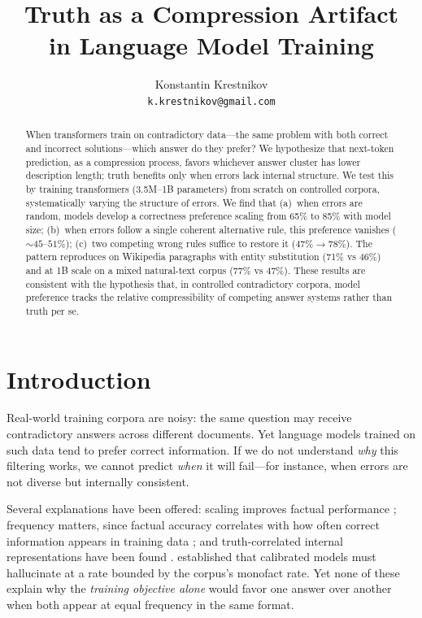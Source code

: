 \documentclass{article}
\title{Truth as a Compression Artifact\\in Language Model Training}
\author{Konstantin Krestnikov\\
\texttt{k.krestnikov@gmail.com}}
\date{}
\begin{document}
\maketitle

\begin{abstract}
When transformers train on contradictory data---the same problem with both correct and incorrect solutions---which answer do they prefer? We hypothesize that next-token prediction, as a compression process, favors whichever answer cluster has lower description length; truth benefits only when errors lack internal structure. We test this by training transformers (3.5M--1B parameters) from scratch on controlled corpora, systematically varying the structure of errors. We find that (a)~when errors are random, models develop a correctness preference scaling from 65\% to 85\% with model size; (b)~when errors follow a single coherent alternative rule, this preference vanishes (${\sim}45$--$51\%$); (c)~two competing wrong rules suffice to restore it ($47\% \to 78\%$). The pattern reproduces on Wikipedia paragraphs with entity substitution (71\% vs 46\%) and at 1B scale on a mixed natural-text corpus (77\% vs 47\%). These results are consistent with the hypothesis that, in controlled contradictory corpora, model preference tracks the relative compressibility of competing answer systems rather than truth per se.
\end{abstract}

\section{Introduction}

Real-world training corpora are noisy: the same question may receive contradictory answers across different documents. Yet language models trained on such data tend to prefer correct information. If we do not understand \emph{why} this filtering works, we cannot predict \emph{when} it will fail---for instance, when errors are not diverse but internally consistent.

Several explanations have been offered: scaling improves factual performance \citep{kadavath2022language}; frequency matters, since factual accuracy correlates with how often correct information appears in training data \citep{elazar2022measuring,joshi2024personas,kandpal2023large}; and truth-correlated internal representations have been found \citep{burns2023discovering,marks2024geometry,burger2024truth}. \citet{kalai2024calibrated} established that calibrated models must hallucinate at a rate bounded by the corpus's monofact rate. Yet none of these explain why the \emph{training objective alone} would favor one answer over another when both appear at equal frequency in the same format.
\end{document}
